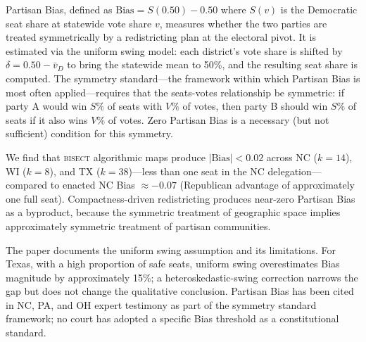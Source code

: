 Partisan Bias, defined as $\text{Bias} = S(0.50) - 0.50$ where $S(v)$ is the Democratic seat share
at statewide vote share $v$, measures whether the two parties are treated symmetrically by a
redistricting plan at the electoral pivot. It is estimated via the uniform swing model: each
district's vote share is shifted by $\delta = 0.50 - \bar{v}_D$ to bring the statewide mean to 50\%,
and the resulting seat share is computed. The symmetry standard---the framework within which Partisan
Bias is most often applied---requires that the seats-votes relationship be symmetric: if party A would
win $S\%$ of seats with $V\%$ of votes, then party B should win $S\%$ of seats if it also wins $V\%$
of votes. Zero Partisan Bias is a necessary (but not sufficient) condition for this symmetry.

We find that \textsc{bisect} algorithmic maps produce $|\text{Bias}| < 0.02$ across NC ($k=14$),
WI ($k=8$), and TX ($k=38$)---less than one seat in the NC delegation---compared to enacted NC
Bias $\approx -0.07$ (Republican advantage of approximately one full seat). Compactness-driven
redistricting produces near-zero Partisan Bias as a byproduct, because the symmetric treatment
of geographic space implies approximately symmetric treatment of partisan communities.

The paper documents the uniform swing assumption and its limitations. For Texas, with a high
proportion of safe seats, uniform swing overestimates Bias magnitude by approximately 15\%;
a heteroskedastic-swing correction narrows the gap but does not change the qualitative
conclusion. Partisan Bias has been cited in NC, PA, and OH expert testimony as part of the
symmetry standard framework; no court has adopted a specific Bias threshold as a constitutional
standard.
